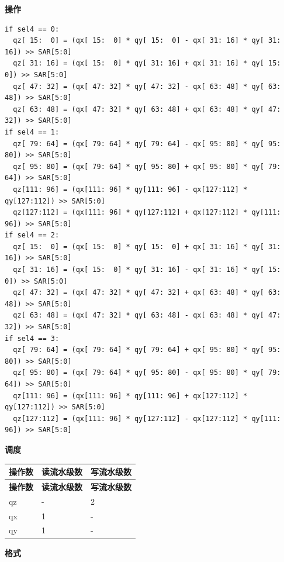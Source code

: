 \textbf{操作}
\begin{lstlisting}
if sel4 == 0:
  qz[ 15:  0] = (qx[ 15:  0] * qy[ 15:  0] - qx[ 31: 16] * qy[ 31: 16]) >> SAR[5:0]
  qz[ 31: 16] = (qx[ 15:  0] * qy[ 31: 16] + qx[ 31: 16] * qy[ 15:  0]) >> SAR[5:0]
  qz[ 47: 32] = (qx[ 47: 32] * qy[ 47: 32] - qx[ 63: 48] * qy[ 63: 48]) >> SAR[5:0]
  qz[ 63: 48] = (qx[ 47: 32] * qy[ 63: 48] + qx[ 63: 48] * qy[ 47: 32]) >> SAR[5:0]
if sel4 == 1:
  qz[ 79: 64] = (qx[ 79: 64] * qy[ 79: 64] - qx[ 95: 80] * qy[ 95: 80]) >> SAR[5:0]
  qz[ 95: 80] = (qx[ 79: 64] * qy[ 95: 80] + qx[ 95: 80] * qy[ 79: 64]) >> SAR[5:0]
  qz[111: 96] = (qx[111: 96] * qy[111: 96] - qx[127:112] * qy[127:112]) >> SAR[5:0]
  qz[127:112] = (qx[111: 96] * qy[127:112] + qx[127:112] * qy[111: 96]) >> SAR[5:0]
if sel4 == 2:
  qz[ 15:  0] = (qx[ 15:  0] * qy[ 15:  0] + qx[ 31: 16] * qy[ 31: 16]) >> SAR[5:0]
  qz[ 31: 16] = (qx[ 15:  0] * qy[ 31: 16] - qx[ 31: 16] * qy[ 15:  0]) >> SAR[5:0]
  qz[ 47: 32] = (qx[ 47: 32] * qy[ 47: 32] + qx[ 63: 48] * qy[ 63: 48]) >> SAR[5:0]
  qz[ 63: 48] = (qx[ 47: 32] * qy[ 63: 48] - qx[ 63: 48] * qy[ 47: 32]) >> SAR[5:0]
if sel4 == 3:
  qz[ 79: 64] = (qx[ 79: 64] * qy[ 79: 64] + qx[ 95: 80] * qy[ 95: 80]) >> SAR[5:0]
  qz[ 95: 80] = (qx[ 79: 64] * qy[ 95: 80] - qx[ 95: 80] * qy[ 79: 64]) >> SAR[5:0]
  qz[111: 96] = (qx[111: 96] * qy[111: 96] + qx[127:112] * qy[127:112]) >> SAR[5:0]
  qz[127:112] = (qx[111: 96] * qy[127:112] - qx[127:112] * qy[111: 96]) >> SAR[5:0]
\end{lstlisting}

\textbf{调度}\\
\begin{longtable}[c]{|l|l|l|}
    \hline
    \rowcolor{lightgray}
    \textbf{操作数} & \textbf{读流水级数} & \textbf{写流水级数} \\\hline
    \endfirsthead
    \hline
    \rowcolor{lightgray}
     \textbf{操作数} & \textbf{读流水级数} & \textbf{写流水级数} \\\hline
    \endhead
    \hline
    \endfoot


    qz & - & 2 \\\hline
     qx & 1 & - \\\hline
     qy & 1 & -


\end{longtable}

\textbf{格式}\\

